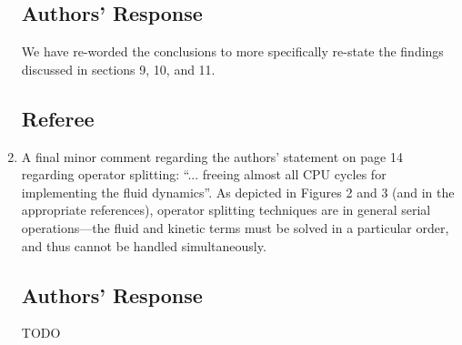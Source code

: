 \documentclass[12pt]{article}
\begin{document}
\begin{enumerate}
\subsection*{Authors' Response}
We have re-worded the conclusions to more specifically re-state the findings discussed in sections 9, 10, and 11.

\subsection*{Referee}
\item A final minor comment regarding the authors' statement on page 14 regarding operator splitting: ``... freeing almost all CPU cycles for implementing the fluid
dynamics''. As depicted in Figures 2 and 3 (and in the appropriate references),
operator splitting techniques are in general serial operations—the fluid and
kinetic terms must be solved in a particular order, and thus cannot be handled
simultaneously.

\subsection*{Authors' Response}
TODO

\end{enumerate}
\end{document}
